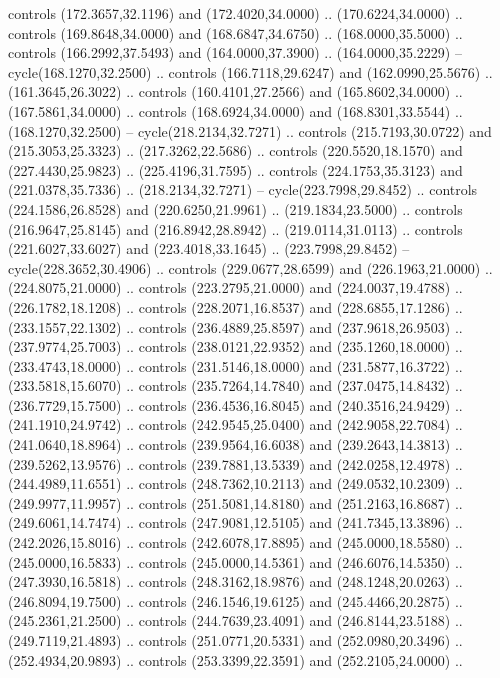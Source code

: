   controls (172.3657,32.1196) and (172.4020,34.0000) .. (170.6224,34.0000) ..
  controls (169.8648,34.0000) and (168.6847,34.6750) .. (168.0000,35.5000) ..
  controls (166.2992,37.5493) and (164.0000,37.3900) .. (164.0000,35.2229) --
  cycle(168.1270,32.2500) .. controls (166.7118,29.6247) and (162.0990,25.5676)
  .. (161.3645,26.3022) .. controls (160.4101,27.2566) and (165.8602,34.0000) ..
  (167.5861,34.0000) .. controls (168.6924,34.0000) and (168.8301,33.5544) ..
  (168.1270,32.2500) -- cycle(218.2134,32.7271) .. controls (215.7193,30.0722)
  and (215.3053,25.3323) .. (217.3262,22.5686) .. controls (220.5520,18.1570)
  and (227.4430,25.9823) .. (225.4196,31.7595) .. controls (224.1753,35.3123)
  and (221.0378,35.7336) .. (218.2134,32.7271) -- cycle(223.7998,29.8452) ..
  controls (224.1586,26.8528) and (220.6250,21.9961) .. (219.1834,23.5000) ..
  controls (216.9647,25.8145) and (216.8942,28.8942) .. (219.0114,31.0113) ..
  controls (221.6027,33.6027) and (223.4018,33.1645) .. (223.7998,29.8452) --
  cycle(228.3652,30.4906) .. controls (229.0677,28.6599) and (226.1963,21.0000)
  .. (224.8075,21.0000) .. controls (223.2795,21.0000) and (224.0037,19.4788) ..
  (226.1782,18.1208) .. controls (228.2071,16.8537) and (228.6855,17.1286) ..
  (233.1557,22.1302) .. controls (236.4889,25.8597) and (237.9618,26.9503) ..
  (237.9774,25.7003) .. controls (238.0121,22.9352) and (235.1260,18.0000) ..
  (233.4743,18.0000) .. controls (231.5146,18.0000) and (231.5877,16.3722) ..
  (233.5818,15.6070) .. controls (235.7264,14.7840) and (237.0475,14.8432) ..
  (236.7729,15.7500) .. controls (236.4536,16.8045) and (240.3516,24.9429) ..
  (241.1910,24.9742) .. controls (242.9545,25.0400) and (242.9058,22.7084) ..
  (241.0640,18.8964) .. controls (239.9564,16.6038) and (239.2643,14.3813) ..
  (239.5262,13.9576) .. controls (239.7881,13.5339) and (242.0258,12.4978) ..
  (244.4989,11.6551) .. controls (248.7362,10.2113) and (249.0532,10.2309) ..
  (249.9977,11.9957) .. controls (251.5081,14.8180) and (251.2163,16.8687) ..
  (249.6061,14.7474) .. controls (247.9081,12.5105) and (241.7345,13.3896) ..
  (242.2026,15.8016) .. controls (242.6078,17.8895) and (245.0000,18.5580) ..
  (245.0000,16.5833) .. controls (245.0000,14.5361) and (246.6076,14.5350) ..
  (247.3930,16.5818) .. controls (248.3162,18.9876) and (248.1248,20.0263) ..
  (246.8094,19.7500) .. controls (246.1546,19.6125) and (245.4466,20.2875) ..
  (245.2361,21.2500) .. controls (244.7639,23.4091) and (246.8144,23.5188) ..
  (249.7119,21.4893) .. controls (251.0771,20.5331) and (252.0980,20.3496) ..
  (252.4934,20.9893) .. controls (253.3399,22.3591) and (252.2105,24.0000) ..
